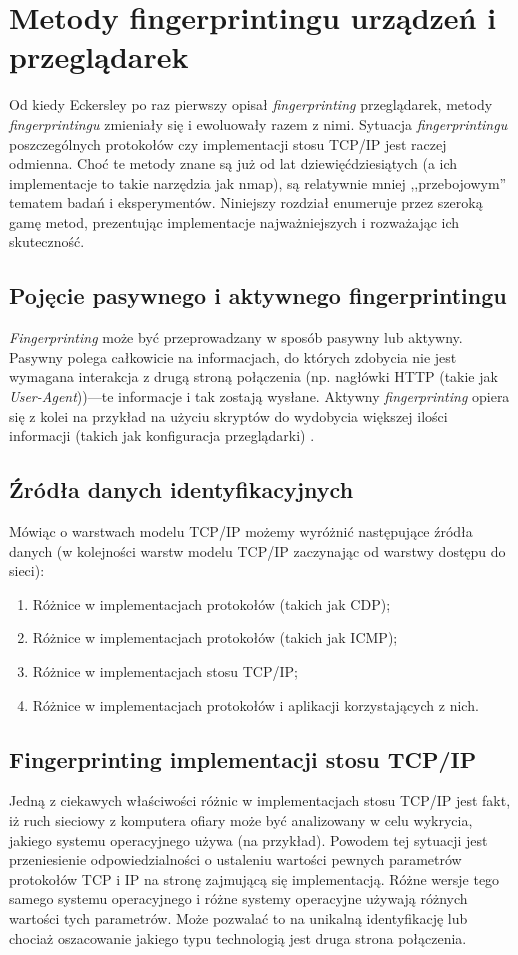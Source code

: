\chapter{Metody fingerprintingu urządzeń i przeglądarek}
Od kiedy Eckersley \cite{eckersley2010unique} po raz pierwszy opisał
\emph{fingerprinting} przeglądarek, metody \emph{fingerprintingu} zmieniały się
i ewoluowały razem z nimi. Sytuacja \emph{fingerprintingu} poszczególnych
protokołów czy implementacji stosu TCP/IP jest raczej odmienna. Choć te metody
znane są już od lat dziewięćdziesiątych (a ich implementacje to takie narzędzia
jak nmap), są relatywnie mniej ,,przebojowym'' tematem badań i eksperymentów.
Niniejszy rozdział enumeruje przez szeroką gamę metod, prezentując implementacje
najważniejszych i rozważając ich skuteczność.

\section{Pojęcie pasywnego i aktywnego fingerprintingu}
\emph{Fingerprinting} może być przeprowadzany w sposób pasywny lub aktywny.
Pasywny polega całkowicie na informacjach, do których zdobycia nie jest wymagana
interakcja z drugą stroną połączenia (np. nagłówki HTTP (takie jak
\emph{User-Agent}))---te informacje i tak zostają wysłane. Aktywny
\emph{fingerprinting} opiera się z kolei na przykład na użyciu skryptów do
wydobycia większej ilości informacji (takich jak konfiguracja przeglądarki)
\cite[s. 3]{al2020too}.

\section{Źródła danych identyfikacyjnych}
Mówiąc o warstwach modelu TCP/IP możemy wyróżnić następujące źródła danych (w
kolejności warstw modelu TCP/IP zaczynając od warstwy dostępu do sieci):
\begin{enumerate}
	\item Różnice w implementacjach protokołów (takich jak CDP);
	\item Różnice w implementacjach protokołów (takich jak ICMP);
	\item Różnice w implementacjach stosu TCP/IP;
	\item Różnice w implementacjach protokołów i aplikacji korzystających z
	      nich.
\end{enumerate}

\section{Fingerprinting implementacji stosu TCP/IP}
Jedną z ciekawych właściwości różnic w implementacjach stosu TCP/IP jest fakt,
iż ruch sieciowy z komputera ofiary może być analizowany w celu wykrycia,
jakiego systemu operacyjnego używa (na przykład). Powodem tej sytuacji jest
przeniesienie odpowiedzialności o ustaleniu wartości pewnych parametrów
protokołów TCP i IP na stronę zajmującą się implementacją. Różne wersje tego
samego systemu operacyjnego i różne systemy operacyjne używają różnych wartości
tych parametrów. Może pozwalać to na unikalną identyfikację lub chociaż
oszacowanie jakiego typu technologią jest druga strona połączenia.

